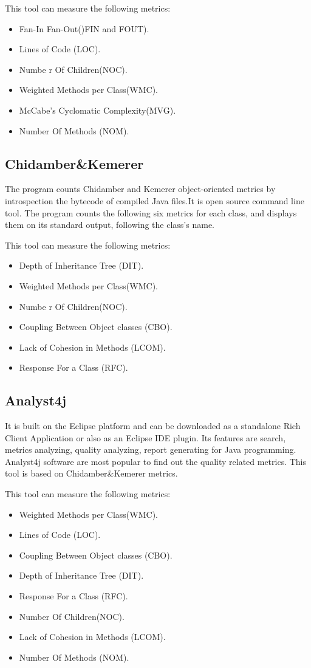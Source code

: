 This tool can measure the following metrics:
\begin{itemize}
	\item Fan-In Fan-Out()FIN and FOUT).
	\item Lines of Code (LOC). 
	\item Numbe r Of Children(NOC).
	\item Weighted Methods per Class(WMC).
	\item McCabe's Cyclomatic Complexity(MVG).
	\item Number Of Methods (NOM).
\end{itemize}

\subsection{Chidamber\&Kemerer}

The program counts Chidamber and Kemerer object-oriented metrics by introspection the bytecode of compiled Java files.It is open source command line tool. The program counts the following six metrics for each class, and displays them on its standard output, following the class's name.

This tool can measure the following metrics:

\begin{itemize}
	\item Depth of Inheritance Tree (DIT).
	\item Weighted Methods per Class(WMC).
	\item Numbe r Of Children(NOC).
	\item Coupling Between Object classes (CBO).
	\item Lack of Cohesion in Methods (LCOM).
	\item Response For a Class (RFC).
\end{itemize}

\subsection{Analyst4j}
It is built on the Eclipse platform and can be downloaded as a standalone Rich Client Application or also as an Eclipse
IDE plugin. Its features are search, metrics analyzing, quality analyzing, report generating for Java programming.
Analyst4j software are most popular to find out the quality related metrics. This tool is based on Chidamber\&Kemerer metrics.

This tool can measure the following metrics:
\begin{itemize}
	\item Weighted Methods per Class(WMC).
	\item Lines of Code (LOC). 
	\item Coupling Between Object classes (CBO).
	\item Depth of Inheritance Tree (DIT).
	\item Response For a Class (RFC).
	\item Number Of Children(NOC).
	\item Lack of Cohesion in Methods (LCOM).
	\item Number Of Methods (NOM).
\end{itemize}


